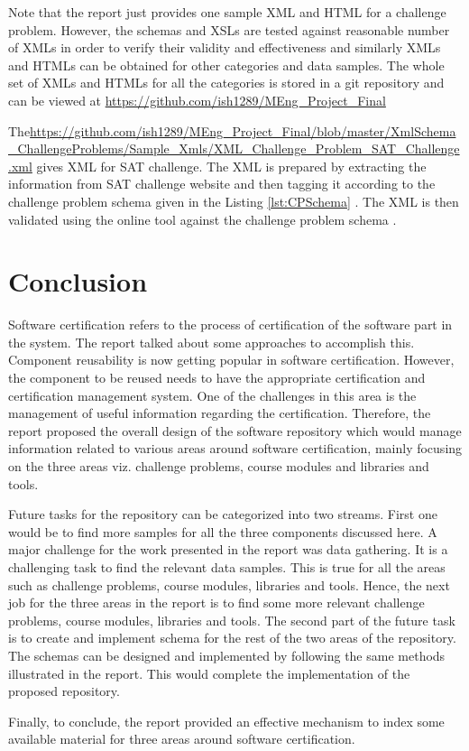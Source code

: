 \documentclass[11pt,letterpaper]{report}
\begin{document}
Note that the report just provides one sample XML and HTML for a challenge problem. However, the schemas and XSLs are tested against reasonable number of XMLs in order to verify their validity and effectiveness and similarly XMLs and HTMLs can be obtained for other categories and data samples. The whole set of XMLs and HTMLs for all the categories is stored in a git repository and can be viewed at \url{https://github.com/ish1289/MEng_Project_Final}

The\url{https://github.com/ish1289/MEng_Project_Final/blob/master/XmlSchema_ChallengeProblems/Sample_Xmls/XML_Challenge_Problem_SAT_Challenge.xml} gives XML for SAT challenge. The XML is prepared by extracting the information from SAT challenge website and then tagging it according to the challenge problem schema given in the Listing \ref{lst:CPSchema} \cite{SAT}. The XML is then validated using the online tool against the challenge problem schema \cite{olXSD}.

\chapter{Conclusion}
Software certification refers to the process of certification of the software part in the system. The report talked about some approaches to accomplish this. Component reusability is now getting popular in software certification. However, the component to be reused needs to have the appropriate certification and certification management system. One of the challenges in this area is the management of useful information regarding the certification. Therefore, the report proposed the overall design of the software repository which would manage information related to various areas around software certification, mainly focusing on the three areas viz. challenge problems, course modules and libraries and tools.  

Future tasks for the repository can be categorized into two streams. First one would be to find more samples for all the three components discussed here. A major challenge for the work presented in the report was data gathering. It is a challenging task to find the relevant data samples. This is true for all the areas such as challenge problems, course modules, libraries and tools. Hence, the next job for the three areas in the report is to find some more relevant challenge problems, course modules, libraries and tools. The second part of the future task is to create and implement schema for the rest of the two areas of the repository. The schemas can be designed and implemented by following the same methods illustrated in the report. This would complete the implementation of the proposed repository.  

Finally, to conclude, the report provided an effective mechanism to index some available material for three areas around software certification. 



\end{document}
